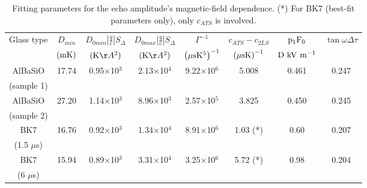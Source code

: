 \documentclass[10pt]{article}
\begin{document}
\begin{table}[htbp]
\begin{center}
\begin{tabular}{ |c|c|c|c|c|c|c|c| }
\hline
Glass type & $D_{min}$ & $D_{0min}\left|\frac{q}{e}\right|S_{\Delta }$ & $D_{0max}\left|\frac{q}{e}\right|S_{\Delta }$ & ${\Gamma }^{-1}$ & $c_{ATS}-c_{2LS}$ & ${{\rm p}}_{{\rm 1}}{{\rm F}}_0$ & ${\tan  \omega \Delta \tau }$ \\
 & ${\rm (mK)}$ & $({\rm K}\AA^2)$ & $({\rm K}\AA^2)$ & ${\left(\mu {\rm s}{{\rm K}}^5\right)}^{-1}$ & ${\left(\mu {\rm s} {\rm K}\right)}^{-1}$ & ${\rm D}~{\rm kV}~{{\rm m}}^{-1}$ &  \\
\hline
AlBaSiO & 17.74 & 0.95$\times$10${}^{3}$ & 2.13$\times$10${}^{4}$ & 9.22$\times$10${}^{6}$ & 5.008 & 0.461 & 0.247 \\
(sample 1) & & & & & & & \\
\hline
AlBaSiO & 27.20 & 1.14$\times$10${}^{3}$ & 8.96$\times$10${}^{3}$ & 2.57$\times$10${}^{5}$ & 3.825 & 0.450 & 0.245 \\
(sample 2) & & & & & & & \\
\hline
BK7\newline & 16.76 & 0.92$\times$10${}^{3}$ & 1.34$\times$10${}^{4}$ & 8.91$\times$10${}^{6}$ & 1.03 (*) & 0.60 & 0.207 \\ 
(1.5 $\mu $s) & & & & & & & \\
\hline
BK7\newline & 15.94 & 0.89$\times$10${}^{3}$ & 3.31$\times$10${}^{4}$ & 3.25$\times$10${}^{6}$ & 5.72 (*) & 0.98 & 0.204 \\
(6 $\mu $s) & & & & & & & \\
\hline
\end{tabular}
\caption{Fitting parameters for the echo amplitude's magnetic-field dependence. 
(*) For BK7 (best-fit parameters only), only $c_{ATS}$ is involved.}
 \label{table91}
\end{center}
\end{table}
\end{document}
